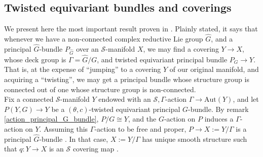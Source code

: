 \subsection{Twisted equivariant bundles and coverings}
We present here the most important result proven in \parencite{barajas2023non}. Plainly stated, it says that whenever we have a non-connected complex reductive Lie group \(\hat{G}\), and a principal \(\hat{{G}}\)-bundle \(P_{\hat{G}}\) over an \(\mathcal{S}\)-manifold \(X\), we may find a covering \(Y \to X\), whose deck group is \(\Gamma=\hat{{G}}/G\), and twisted equivariant principal bundle \(P_G \to Y\). That is, at the expense of ``jumping'' to a covering \(Y\) of our original manifold, and acquiring a ``twisting'', we may get a principal bundle whose structure group is connected out of one whose structure group is non-connected. \\

Fix a connected \(\mathcal{S}\)-manifold \(Y\) endowed with an \(\mathcal{S},\Gamma\)-action \(\Gamma \to \mathrm{Aut}(Y)\), and let \(P(Y,G)\to Y\) be a \((\theta, c)\)-twisted equivariant principal \(G\)-bundle. By remark \ref{action_principal_G_bundle}, \(P/G \cong Y\), and the \(G\)-action on \(P\) induces a \(\Gamma\)-action on \(Y\). Assuming this \(\Gamma\)-action to be free and proper, \(P \to X:=Y/\Gamma\) is a principal \(\hat{G}\)-bundle \parencite[Sec. 4.1]{barajas2023non}. In that case, \(X:=Y/\Gamma\) has unique smooth structure such that \(q\colon Y \to X\) is an \(\mathcal{S}\) covering map \parencite[Th. 21.13]{lee_introSM}.\\

